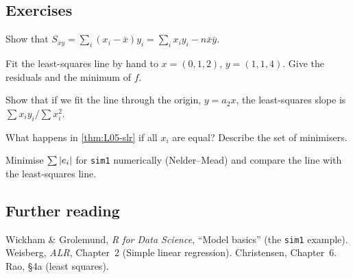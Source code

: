 \subsection{Exercises}
\begin{problem}\label{prob:L05-1}
Show that $S_{xy}=\sum_i (x_i-\bar x)y_i=\sum_i x_iy_i-n\bar x\bar y$.
\end{problem}
\begin{problem}\label{prob:L05-2}
Fit the least-squares line by hand to $x=(0,1,2)$, $y=(1,1,4)$. Give the residuals and the minimum of $f$.
\end{problem}
\begin{problem}\label{prob:L05-3}
Show that if we fit the line through the origin, $y=a_2x$, the least-squares slope is $\sum x_iy_i/\sum x_i^2$.
\end{problem}
\begin{problem}\label{prob:L05-4}
What happens in \cref{thm:L05-slr} if all $x_i$ are equal? Describe the set of minimisers.
\end{problem}
\begin{problem}\label{prob:L05-5}
Minimise $\sum\left|e_i\right|$ for \texttt{sim1} numerically (Nelder--Mead) and compare the line with the least-squares line.
\end{problem}

\subsection{Further reading}
Wickham \& Grolemund, \emph{R for Data Science}, ``Model basics'' (the \texttt{sim1} example).
Weisberg, \emph{ALR}, Chapter~2 (Simple linear regression). Christensen, Chapter~6.
Rao, \S4a (least squares).
